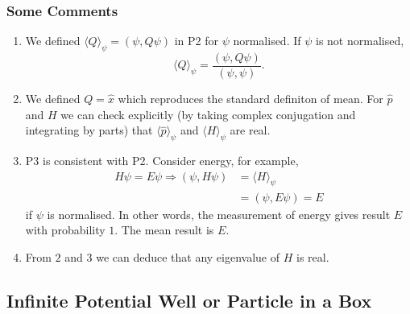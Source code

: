 \documentclass[a4paper]{article}
\theoremstyle{definition}
\begin{document}
\subsubsection{Some Comments}

\begin{enumerate}
\item We defined \(\langle Q\rangle_\psi = (\psi, Q\psi)\) in P2 for \(\psi\) normalised. If \(\psi\) is not normalised,
  \[
    \langle Q\rangle_\psi =  \frac{(\psi, Q\psi)}{(\psi, \psi)}.
    \]
  \item We defined \(Q=\hat x\) which reproduces the standard definiton of mean. For \(\hat p\) and \(H\) we can check explicitly (by taking complex conjugation and integrating by parts) that \(\langle \hat p \rangle_\psi\) and \(\langle H\rangle_\psi\) are real.
\item P3 is consistent with P2. Consider energy, for example,
  \begin{align*}
    H\psi = E\psi \Rightarrow (\psi, H\psi) &= \langle H\rangle_\psi\\
    &= (\psi, E\psi) = E
  \end{align*}
  if \(\psi\) is normalised. In other words, the measurement of energy gives result \(E\) with probability \(1\). The mean result is \(E\).
\item From $2$ and $3$ we can deduce that any eigenvalue of \(H\) is real.
\end{enumerate}

\subsection{Infinite Potential Well or Particle in a Box}
\end{document}
